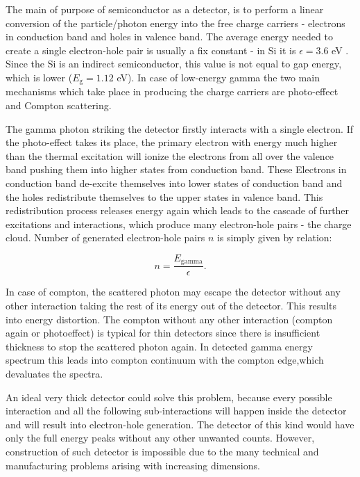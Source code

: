 \par
The main of purpose of semiconductor as a detector, is to perform a linear conversion of the particle/photon energy into the free charge carriers - electrons in conduction band and holes in valence band. The average energy needed to create a single electron-hole pair is usually a fix constant - in Si it is $\epsilon = 3.6$ eV \cite{Lutz_2007}. Since the Si is an indirect semiconductor, this value is not equal to gap energy, which is lower ($E_{\textrm{g}} = 1.12$ eV). In case of low-energy gamma the two main mechanisms which take place in producing the charge carriers are photo-effect and Compton scattering. 

\par
The gamma photon striking the detector firstly interacts with a single electron. If the photo-effect takes its place, the primary electron with energy much higher than the thermal excitation will ionize the electrons from all over the valence band pushing them into higher states from conduction band. These Electrons in conduction band de-excite themselves into lower states of conduction band and the holes redistribute themselves to the upper states in valence band. This redistribution process releases energy again which leads to the cascade of further excitations and interactions, which produce many electron-hole pairs - the charge cloud. Number of generated electron-hole pairs $n$ is simply given by relation:


\begin{equation}
n = \frac{E_{\textrm{gamma}}}{\epsilon}.
\end{equation}

\par
In case of compton, the scattered photon may escape the detector without any other interaction taking the rest of its energy out of the detector. This results into energy distortion. The compton without any other interaction (compton again or photoeffect) is typical for thin detectors since there is insufficient thickness to stop the scattered photon again. In detected gamma energy spectrum this leads into compton continuum with the compton edge,which devaluates the spectra.

\par
An ideal very thick detector could solve this problem, because every possible interaction and all the following sub-interactions will happen inside the detector and will result into electron-hole generation. The detector of this kind would have only the full energy peaks without any other unwanted counts. However, construction of such detector is impossible due to the many technical and manufacturing problems arising with increasing dimensions. 

